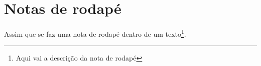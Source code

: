 \chapter{Notas de rodapé}

Assim que se faz uma nota de rodapé dentro de um texto\footnote{Aqui vai a descrição da nota de rodapé}.